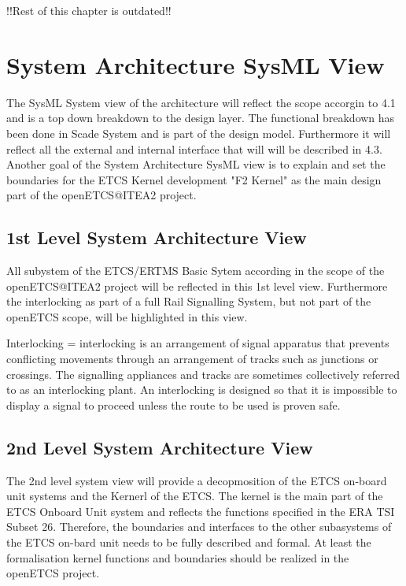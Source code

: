




{\Huge !!Rest of this chapter is outdated!!}


\section{System Architecture SysML View}
The SysML System view of the architecture will reflect the scope accorgin to 4.1 and is a top down breakdown to the design layer. The functional breakdown has been done in Scade System and is part of the design model. Furthermore it will reflect all the external and internal interface that will will be described in 4.3. Another goal of the System Architecture SysML view is to explain and set the boundaries for the ETCS Kernel development "F2 Kernel" as the main design part of the openETCS@ITEA2 project.

\subsection{1st Level System Architecture View}
All subystem of the ETCS/ERTMS Basic Sytem according in the scope of the openETCS@ITEA2 project will be reflected in this 1st level view. Furthermore the interlocking as part of a full Rail Signalling System, but not part of the openETCS scope, will be highlighted in this view.

Interlocking =  interlocking is an arrangement of signal apparatus that prevents conflicting movements through an arrangement of tracks such as junctions or crossings. The signalling appliances and tracks are sometimes collectively referred to as an interlocking plant. An interlocking is designed so that it is impossible to display a signal to proceed unless the route to be used is proven safe.




\subsection{2nd Level System Architecture View}
The 2nd level system view will provide a decopmosition of the ETCS on-board unit systems and the Kernerl of the ETCS. The kernel is the main part of the ETCS Onboard Unit system and reflects the functions specified in the ERA TSI Subset 26. Therefore, the boundaries and interfaces to the other subasystems of the ETCS on-bard unit needs to be fully described and formal. At least the formalisation kernel functions and boundaries should be realized in the openETCS project.

